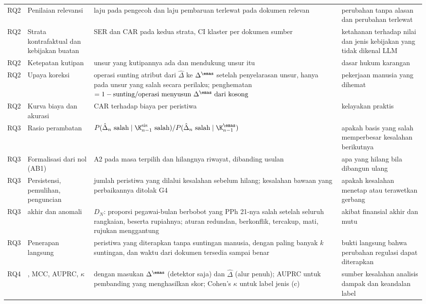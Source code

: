 \begin{table}[t]
\begin{tabularx}{\textwidth}{@{}P{1.2cm} P{3.3cm} L P{3.6cm}@{}}
RQ2 & Penilaian relevansi & laju  pada pengecoh dan laju pembaruan terlewat pada dokumen relevan & perubahan tanpa alasan dan perubahan terlewat \\
RQ2 & Strata kontrafaktual dan kebijakan buatan & SER dan CAR pada kedua strata, CI  klaster per dokumen sumber & ketahanan terhadap nilai dan jenis kebijakan yang tidak dikenal LLM \\
RQ2 & Ketepatan kutipan & unsur yang kutipannya ada dan mendukung unsur itu & dasar hukum karangan \\
RQ2 & Upaya koreksi & operasi sunting atribut dari $\hat{\Delta}$ ke $\Delta^{\emas}$ setelah penyelarasan unsur, hanya pada unsur yang salah secara perilaku; penghematan $= 1 - \text{sunting}/\text{operasi menyusun } \Delta^{\emas} \text{ dari kosong}$ & pekerjaan manusia yang dihemat \\
RQ2 & Kurva biaya dan akurasi & CAR terhadap biaya per peristiwa & kelayakan praktis \\
\midrule
RQ3 & Rasio perambatan & $P(\hat{\Delta}_n \text{ salah} \mid \K^{\mathrm{sis}}_{n-1} \text{ salah}) / P(\hat{\Delta}_n \text{ salah} \mid \K^{\emas}_{n-1})$ & apakah basis yang salah memperbesar kesalahan berikutnya \\
RQ3 & Formalisasi dari nol (AB1) & A2 pada masa terpilih dan hilangnya riwayat, dibanding usulan & apa yang hilang bila  dibangun ulang \\
RQ3 & Persistensi, pemulihan, penguncian & jumlah peristiwa yang dilalui kesalahan sebelum hilang; kesalahan bawaan yang perbaikannya ditolak G4 & apakah kesalahan menetap atau terawetkan gerbang \\
RQ3 &  akhir dan anomali & $D_N$: proporsi pegawai-bulan berbobot yang PPh 21-nya salah setelah seluruh rangkaian, beserta rupiahnya; aturan redundan, berkonflik, tercakup, mati, rujukan menggantung & akibat finansial akhir dan mutu  \\
RQ3 & Penerapan langsung & peristiwa yang diterapkan tanpa suntingan manusia, dengan paling banyak $k$ suntingan, dan waktu dari dokumen tersedia sampai  benar & bukti langsung bahwa perubahan regulasi dapat diterapkan \\
\midrule
RQ4 & , MCC, AUPRC, $\kappa$ & dengan masukan $\Delta^{\emas}$ (detektor saja) dan $\hat{\Delta}$ (alur penuh); AUPRC untuk pembanding yang menghasilkan skor; Cohen's $\kappa$ untuk label jenis (c) & sumber kesalahan analisis dampak dan keandalan label \\
\bottomrule
\end{tabularx}
\end{table}

